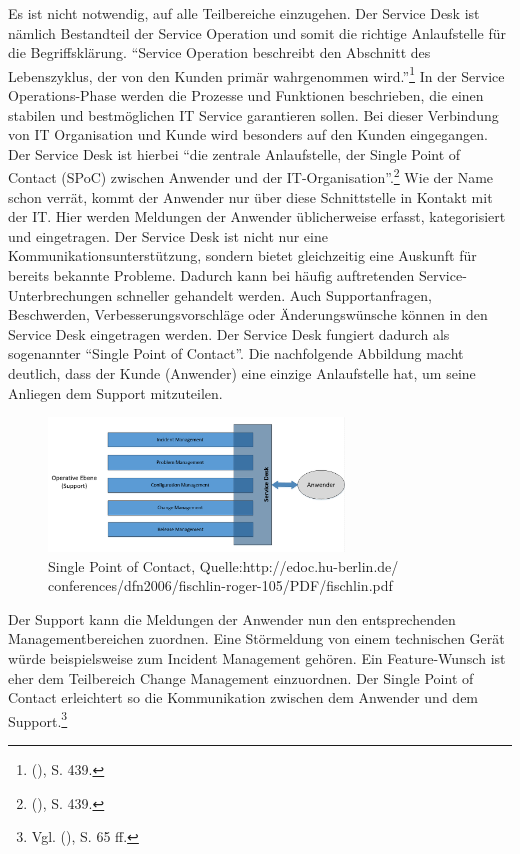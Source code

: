 \noindent
Es ist nicht notwendig, auf alle Teilbereiche einzugehen. Der Service Desk ist nämlich Bestandteil der Service Operation und somit die richtige Anlaufstelle für die Begriffsklärung. \newline \enquote{Service Operation beschreibt den Abschnitt des Lebenszyklus, der von den Kunden primär wahrgenommen wird.}\footnote{\citeauthor{Ebel} (\citeyear{Ebel}), S. 439.} In der Service Operations-Phase werden die Prozesse und Funktionen beschrieben, die einen stabilen  und bestmöglichen IT Service garantieren sollen. Bei dieser Verbindung von IT Organisation und Kunde wird besonders auf den Kunden eingegangen. Der Service Desk ist hierbei \enquote{die zentrale Anlaufstelle, der Single Point of Contact (SPoC) zwischen Anwender und der IT-Organisation}.\footnote{\citeauthor{Ebel} (\citeyear{Ebel}), S. 439.} Wie der Name schon verrät, kommt der Anwender nur über diese Schnittstelle in Kontakt mit der IT. Hier werden Meldungen der Anwender üblicherweise erfasst, kategorisiert und eingetragen. Der Service Desk ist nicht nur eine Kommunikationsunterstützung, sondern bietet gleichzeitig eine Auskunft für bereits bekannte Probleme. Dadurch kann bei häufig auftretenden Service-Unterbrechungen schneller gehandelt werden. Auch Supportanfragen, Beschwerden, Verbesserungsvorschläge oder Änderungswünsche können in den Service Desk eingetragen werden. Der Service Desk fungiert dadurch als sogenannter \enquote{Single Point of Contact}. Die nachfolgende Abbildung macht deutlich, dass der Kunde (Anwender) eine einzige Anlaufstelle hat, um seine Anliegen dem Support mitzuteilen. 

\begin{figure}[h!]
\centering
	\includegraphics[width=0.70\textwidth]{Abbildungen/SPOC_3.png}
	\caption[Single Point of Contact]{Single Point of Contact, Quelle:http://edoc.hu-berlin.de/
	conferences/dfn2006/fischlin-roger-105/PDF/fischlin.pdf}
	\label{fig:ITIL_Single_Point_of_Contact}
\end{figure}

\noindent
Der Support kann die Meldungen der Anwender nun den entsprechenden Managementbereichen zuordnen. Eine Störmeldung von einem technischen Gerät würde beispielsweise zum Incident Management gehören. Ein Feature-Wunsch ist eher dem Teilbereich Change Management einzuordnen. Der Single Point of Contact  erleichtert so die Kommunikation zwischen dem Anwender und dem Support.\footnote{Vgl. \citeauthor{Ebel} (\citeyear{Ebel}), S. 65 ff.}\\ 


